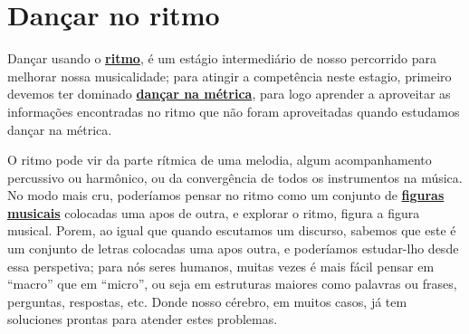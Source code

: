 
\newpage
\section{Dançar no ritmo}
\label{subsec:dancaritmo}
 Dançar usando o \hyperref[sec:pos:Ritmo]{\textbf{ritmo}},
é um estágio intermediário de nosso percorrido para melhorar nossa musicalidade;
para atingir a competência neste estagio, 
primeiro devemos ter dominado \hyperref[subsec:dancametrica]{\textbf{dançar na métrica}},
para logo aprender a aproveitar as informações encontradas 
no ritmo que não foram aproveitadas quando estudamos dançar na métrica. 

O ritmo pode vir da parte rítmica de uma melodia, 
algum acompanhamento percussivo ou harmônico, 
ou da convergência de todos os instrumentos na música.
No modo mais cru, poderíamos pensar no ritmo
como um conjunto de \hyperref[sec:figurasmusicais]{\textbf{figuras musicais}} 
colocadas uma apos de outra, 
e explorar o ritmo, figura a figura musical. %
Porem, ao igual que quando escutamos um discurso,
sabemos que este é um conjunto de letras colocadas uma apos outra,
e poderíamos estudar-lho desde essa perspetiva;
para nós seres humanos, 
muitas vezes é mais fácil pensar em ``macro'' que em ``micro'',
ou seja em estruturas maiores como palavras ou frases, perguntas, respostas, etc. 
Donde nosso cérebro, em muitos casos, 
já tem soluciones prontas para atender estes problemas.


